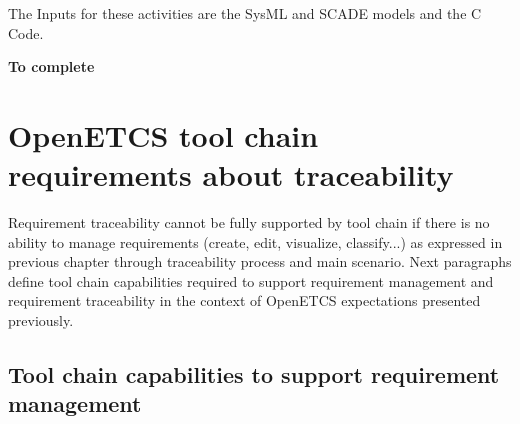 \documentclass[11pt]{template/openetcs_report}
\begin{document}
The Inputs for these activities are the SysML and SCADE models and the C Code.

\textbf{To complete}

\chapter{OpenETCS tool chain requirements about traceability}
\label{sec-4} 
Requirement traceability cannot be fully supported by tool chain if there is no ability to manage requirements (create, edit, visualize, classify...) as expressed in previous chapter through traceability process and main scenario.
Next paragraphs define tool chain capabilities required to support requirement management and requirement traceability in the context of OpenETCS expectations presented previously.

\section{Tool chain capabilities to support requirement management}
\end{document}
